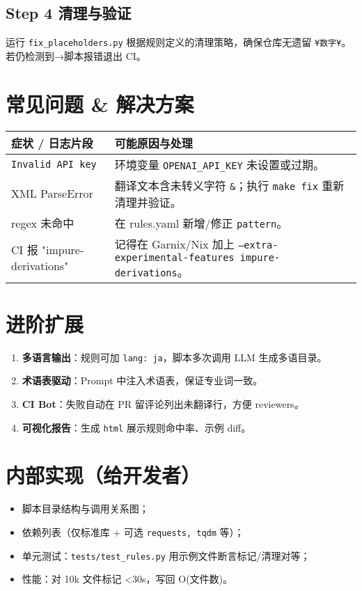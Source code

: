 \documentclass[12pt]{article}
\begin{document}
\subsection{Step 4 清理与验证}
运行 \texttt{fix\_placeholders.py} 根据规则定义的清理策略，确保仓库无遗留 \verb|¥数字¥|。若仍检测到→脚本报错退出 CI。

\section{常见问题 \& 解决方案}
\begin{longtable}{p{5cm} p{9cm}}
\hline
症状 / 日志片段 & 可能原因与处理 \\ \hline
\texttt{Invalid API key} & 环境变量 \texttt{OPENAI\_API\_KEY} 未设置或过期。\\
XML ParseError & 翻译文本含未转义字符 \verb|&|；执行 \lstinline|make fix| 重新清理并验证。\\
regex 未命中 & 在 rules.yaml 新增/修正 \texttt{pattern}。\\
CI 报 "impure-derivations" & 记得在 Garnix/Nix 加上 \texttt{--extra-experimental-features impure-derivations}。\\
\hline
\end{longtable}

\section{进阶扩展}
\begin{enumerate}
  \item \textbf{多语言输出}：规则可加 \texttt{lang: ja}，脚本多次调用 LLM 生成多语目录。
  \item \textbf{术语表驱动}：Prompt 中注入术语表，保证专业词一致。
  \item \textbf{CI Bot}：失败自动在 PR 留评论列出未翻译行，方便 reviewers。
  \item \textbf{可视化报告}：生成 \texttt{html} 展示规则命中率、示例 diff。
\end{enumerate}

\section{内部实现（给开发者）}
\begin{itemize}
  \item 脚本目录结构与调用关系图；
  \item 依赖列表（仅标准库 + 可选 \texttt{requests, tqdm} 等）；
  \item 单元测试：\texttt{tests/test\_rules.py} 用示例文件断言标记/清理对等；
  \item 性能：对 10k 文件标记 <30s，写回 O(文件数)。
\end{itemize}
\end{document}
